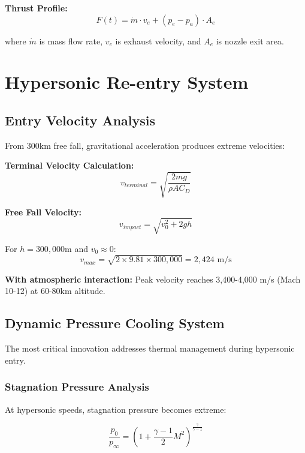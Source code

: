 \documentclass[11pt,a4paper]{article}
\begin{document}
\textbf{Thrust Profile:}
\begin{equation}
F(t) = \dot{m} \cdot v_e + (p_e - p_a) \cdot A_e
\end{equation}

where $\dot{m}$ is mass flow rate, $v_e$ is exhaust velocity, and $A_e$ is nozzle exit area.

\section{Hypersonic Re-entry System}

\subsection{Entry Velocity Analysis}

From 300km free fall, gravitational acceleration produces extreme velocities:

\textbf{Terminal Velocity Calculation:}
\begin{equation}
v_{terminal} = \sqrt{\frac{2mg}{\rho A C_D}}
\end{equation}

\textbf{Free Fall Velocity:}
\begin{equation}
v_{impact} = \sqrt{v_0^2 + 2gh}
\end{equation}

For $h = 300,000$m and $v_0 \approx 0$:
\begin{equation}
v_{max} = \sqrt{2 \times 9.81 \times 300,000} = 2,424 \text{ m/s}
\end{equation}

\textbf{With atmospheric interaction:} Peak velocity reaches 3,400-4,000 m/s (Mach 10-12) at 60-80km altitude.

\subsection{Dynamic Pressure Cooling System}

The most critical innovation addresses thermal management during hypersonic entry.

\subsubsection{Stagnation Pressure Analysis}

At hypersonic speeds, stagnation pressure becomes extreme:

\begin{equation}
\frac{p_0}{p_\infty} = \left(1 + \frac{\gamma-1}{2}M^2\right)^{\frac{\gamma}{\gamma-1}}
\end{equation}
\end{document}
